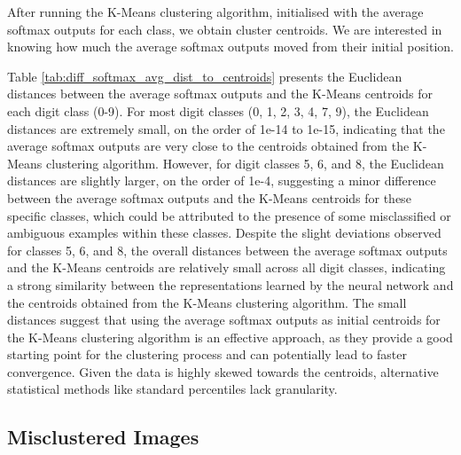 After running the K-Means clustering algorithm, initialised with the  average softmax outputs for each class, we obtain cluster centroids. We are interested in knowing how much the average softmax outputs moved from their initial position. 

Table \ref{tab:diff_softmax_avg_dist_to_centroids} presents the Euclidean distances between the average softmax outputs and the K-Means centroids for each digit class (0-9). For most digit classes (0, 1, 2, 3, 4, 7, 9), the Euclidean distances are extremely small, on the order of 1e-14 to 1e-15, indicating that the average softmax outputs are very close to the centroids obtained from the K-Means clustering algorithm. However, for digit classes 5, 6, and 8, the Euclidean distances are slightly larger, on the order of 1e-4, suggesting a minor difference between the average softmax outputs and the K-Means centroids for these specific classes, which could be attributed to the presence of some misclassified or ambiguous examples within these classes.
Despite the slight deviations observed for classes 5, 6, and 8, the overall distances between the average softmax outputs and the K-Means centroids are relatively small across all digit classes, indicating a strong similarity between the representations learned by the neural network and the centroids obtained from the K-Means clustering algorithm. The small distances suggest that using the average softmax outputs as initial centroids for the K-Means clustering algorithm is an effective approach, as they provide a good starting point for the clustering process and can potentially lead to faster convergence. Given the data is highly skewed towards the centroids, alternative statistical methods like standard percentiles lack granularity.


\subsection{Misclustered Images}


